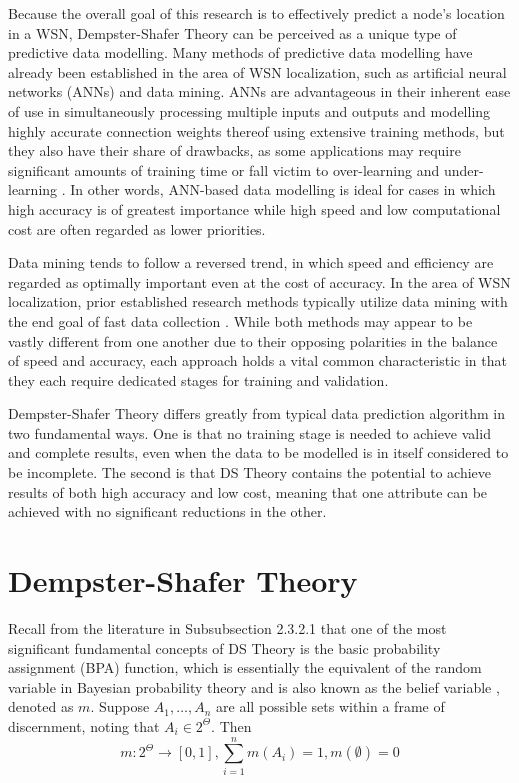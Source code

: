 \documentclass[12pt]{uthesis-v12}  %
\begin{document}
Because the overall goal of this research is to effectively predict a node's location in a WSN, Dempster-Shafer Theory can be perceived as a unique type of predictive data modelling. Many methods of predictive data modelling have already been established in the area of WSN localization, such as artificial neural networks (ANNs) and data mining. ANNs are advantageous in their inherent ease of use in simultaneously processing multiple inputs and outputs and modelling highly accurate connection weights thereof using extensive training methods, but they also have their share of drawbacks, as some applications may require significant amounts of training time or fall victim to over-learning and under-learning \cite{almaadeed}. In other words, ANN-based data modelling is ideal for cases in which high accuracy is of greatest importance while high speed and low computational cost are often regarded as lower priorities. 

Data mining tends to follow a reversed trend, in which speed and efficiency are regarded as optimally important even at the cost of  accuracy. In the area of WSN localization, prior established research methods typically utilize data mining with the end goal of fast data collection \cite{patel}. While both methods may appear to be vastly different from one another due to their opposing polarities in the balance of speed and accuracy, each approach holds a vital common characteristic in that they each require dedicated stages for training and validation.

Dempster-Shafer Theory differs greatly from typical data prediction algorithm in two fundamental ways. One is that no training stage is needed to achieve valid and complete results, even when the data to be modelled is in itself considered to be incomplete. The second is that DS Theory contains the potential to achieve results of both high accuracy and low cost, meaning that one attribute can be achieved with no significant reductions in the other.

\section{Dempster-Shafer Theory}

Recall from the literature in Subsubsection 2.3.2.1 that one of the most significant fundamental concepts of DS Theory is the basic probability assignment (BPA) function, which is essentially the equivalent of the random variable in Bayesian probability theory and is also known as the belief variable \cite{auer}, denoted as $m$. Suppose $A_1,\dots,A_n$ are all possible sets within a frame of discernment, noting that $A_i \in 2^\Theta$. Then
\begin{equation}
m: 2^\Theta \rightarrow [0,1], \sum\limits_{i=1}^n m(A_i) = 1, m(\emptyset) = 0
\label{init}
\end{equation}
\end{document}
